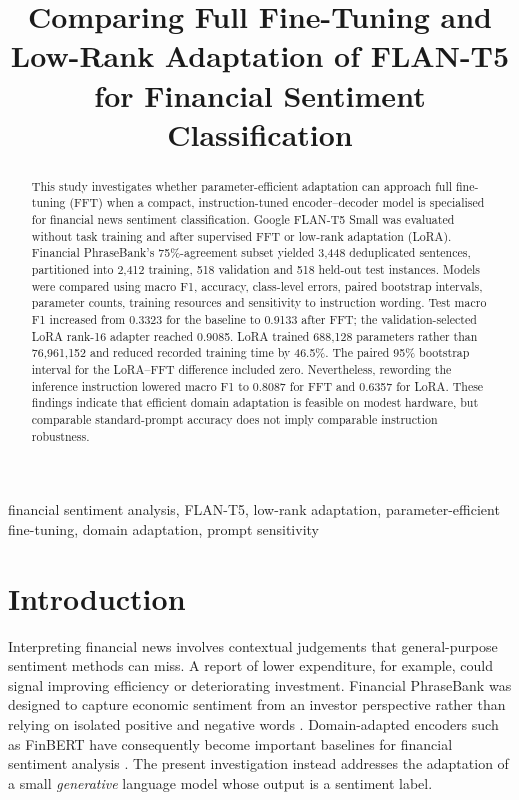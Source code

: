 \documentclass[conference,a4paper]{IEEEtran}
\begin{document}
\title{Comparing Full Fine-Tuning and Low-Rank Adaptation of FLAN-T5 for Financial Sentiment Classification}
\author{
}
\maketitle
\begin{abstract}
This study investigates whether parameter-efficient adaptation can approach full fine-tuning (FFT) when a compact, instruction-tuned encoder--decoder model is specialised for financial news sentiment classification. Google FLAN-T5 Small was evaluated without task training and after supervised FFT or low-rank adaptation (LoRA). Financial PhraseBank's 75\%-agreement subset yielded 3,448 deduplicated sentences, partitioned into 2,412 training, 518 validation and 518 held-out test instances. Models were compared using macro F1, accuracy, class-level errors, paired bootstrap intervals, parameter counts, training resources and sensitivity to instruction wording. Test macro F1 increased from 0.3323 for the baseline to 0.9133 after FFT; the validation-selected LoRA rank-16 adapter reached 0.9085. LoRA trained 688,128 parameters rather than 76,961,152 and reduced recorded training time by 46.5\%. The paired 95\% bootstrap interval for the LoRA--FFT difference included zero. Nevertheless, rewording the inference instruction lowered macro F1 to 0.8087 for FFT and 0.6357 for LoRA. These findings indicate that efficient domain adaptation is feasible on modest hardware, but comparable standard-prompt accuracy does not imply comparable instruction robustness.
\end{abstract}
\begin{IEEEkeywords}
financial sentiment analysis, FLAN-T5, low-rank adaptation, parameter-efficient fine-tuning, domain adaptation, prompt sensitivity
\end{IEEEkeywords}

\section{Introduction}
Interpreting financial news involves contextual judgements that general-purpose sentiment methods can miss. A report of lower expenditure, for example, could signal improving efficiency or deteriorating investment. Financial PhraseBank was designed to capture economic sentiment from an investor perspective rather than relying on isolated positive and negative words \cite{malo2014}. Domain-adapted encoders such as FinBERT have consequently become important baselines for financial sentiment analysis \cite{araci2019}. The present investigation instead addresses the adaptation of a small \emph{generative} language model whose output is a sentiment label.
\end{document}
